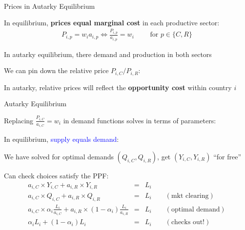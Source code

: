 \documentclass[notes,11pt, aspectratio=169, xcolor=table]{beamer}
\newcommand{\blue}[1]{\textcolor{blue}{#1}}
\newenvironment{wideitemize}{\itemize\addtolength{\itemsep}{10pt}}{\enditemize}
\begin{document}
\begin{frame}{Prices in Autarky Equilibrium}
\begin{wideitemize}
        \item In equilibrium, \textbf{prices equal marginal cost} in each productive sector:
        \begin{eqnarray*}
            P_{i,p} = w_i a_{i,p} \iff \frac{P_{i,p}}{a_{i,p}} = w_i  \qquad \text{ for } p \in\{C,R\}
        \end{eqnarray*}
        \item In autarky equilibrium, there demand and production in both sectors
        \item We can pin down the relative price $P_{i,C} / P_{i,R}$:
        \begin{center}
        \end{center}
    \item In autarky, relative prices will reflect the \textbf{opportunity cost} within country $i$

\end{wideitemize}
\end{frame}

\begin{frame}{Autarky Equilibrium}
\begin{wideitemize}
    \item Replacing $\frac{P_{i,C}}{a_{i,C}} = w_i$ in demand functions solves in terms of parameters:
\begin{center}
\end{center}
    \item In equilibrium, \blue{supply equals demand}:

    \begin{center}
\end{center}

    \item We have solved for optimal demands $( Q_{i,C}, Q_{i,R})$, get $(Y_{i,C}, Y_{i,R})$   ``for free''
    \item Can check choices satisfy the PPF:
    {\scriptsize
        \begin{eqnarray*}
            a_{i,C} \times Y_{i,C} + a_{i,R} \times Y_{i,R} &=& L_i \\
            a_{i,C} \times Q_{i,C} + a_{i,R} \times Q_{i,R} &=& L_i \qquad (\text{mkt clearing}) \\
            a_{i,C} \times \alpha_i  \frac{L_i}{a_{i,C}} + a_{i,R} \times (1-\alpha_i) \frac{L_i}{a_{i,R}}  &=& L_i \qquad (\text{optimal demand}) \\
            \alpha_i  L_i + (1-\alpha_i) L_i  &=& L_i \qquad (\text{checks out!})
        \end{eqnarray*}
        }
\end{wideitemize}
\end{frame}
\end{document}

